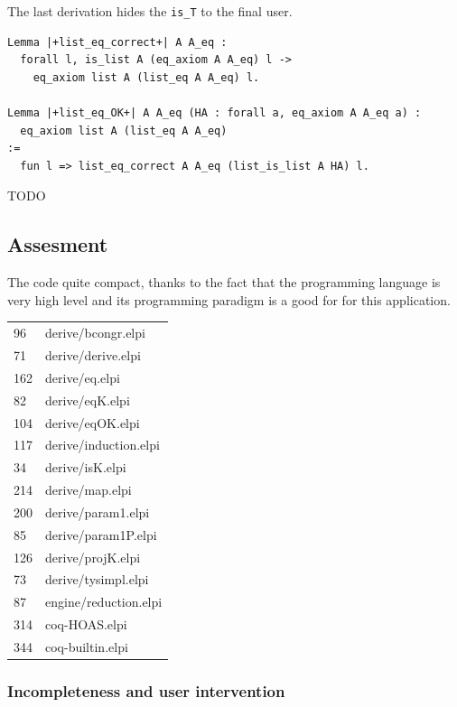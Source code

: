 \documentclass[sigplan,10pt,review]{acmart}\settopmatter{printfolios=true,printccs=false,printacmref=false}
\begin{document}
The last derivation hides the \lstinline+is_T+ to the final user.

\begin{minipage}{\textwidth}\begin{lstlisting}
Lemma |+list_eq_correct+| A A_eq :
  forall l, is_list A (eq_axiom A A_eq) l ->
    eq_axiom list A (list_eq A A_eq) l.

Lemma |+list_eq_OK+| A A_eq (HA : forall a, eq_axiom A A_eq a) :
  eq_axiom list A (list_eq A A_eq)
:=
  fun l => list_eq_correct A A_eq (list_is_list A HA) l.
\end{lstlisting}\end{minipage}

TODO

\subsection{Assesment} %

The code quite compact, thanks to the fact that the programming
language is very high level and its programming paradigm is a good
for for this application.

\begin{tabular}{ll}
   96 & derive/bcongr.elpi\\
   71 & derive/derive.elpi\\
  162 & derive/eq.elpi\\
   82 & derive/eqK.elpi\\
  104 & derive/eqOK.elpi\\
  117 & derive/induction.elpi\\
   34 & derive/isK.elpi\\
  214 & derive/map.elpi\\
  200 & derive/param1.elpi\\
   85 & derive/param1P.elpi\\
  126 & derive/projK.elpi\\
   73 & derive/tysimpl.elpi\\
   87 & engine/reduction.elpi\\
  314 & coq-HOAS.elpi \\
  344 & coq-builtin.elpi
\end{tabular}

\subsubsection{Incompleteness and user intervention} %
\label{sec:oops}
\end{document}
